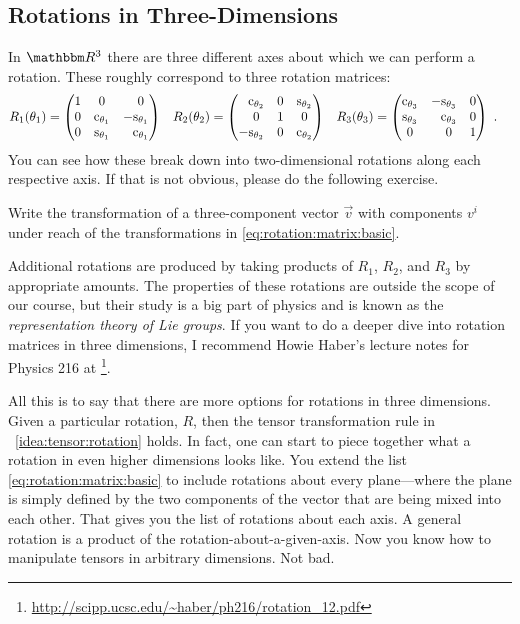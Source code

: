 \documentclass[12pt]{article}
\begin{document}
\subsection{Rotations in Three-Dimensions}

In $\RR ^3$ there are three different axes about which we can perform a rotation. These roughly correspond to three rotation matrices:
\begin{align}
    R_1(\theta_1)
    &=
    \begin{pmatrix}
        1 & 0 & \pp 0 \\
        0 & \text{c}_{\theta_1} & -\text{s}_{\theta_1} \\
        0 & \text{s}_{\theta_1} & \pp \text{c}_{\theta_1}
    \end{pmatrix}
    &
    R_2(\theta_2)
    &=
    \begin{pmatrix}
        \pp \text{c}_{\theta_2} & 0 & \text{s}_{\theta_2} \\
        \pp 0 & 1 & 0 \\
        -\text{s}_{\theta_2} & 0 & \text{c}_{\theta_2}
    \end{pmatrix}
    &
    R_3(\theta_3)
    &=
    \begin{pmatrix}
        \text{c}_{\theta_3} & -\text{s}_{\theta_3} & 0 \\
        \text{s}_{\theta_3} & \pp\text{c}_{\theta_3} & 0 \\
        0 & \pp 0 & 1
    \end{pmatrix} \ .
    \label{eq:rotation:matrix:basic}
\end{align}
You can see how these break down into two-dimensional rotations along each respective axis. If that is not obvious, please do the following exercise.
\begin{exercise}
Write the transformation of a three-component vector $\vec{v}$ with components $v^i$ under reach of the transformations in \eqref{eq:rotation:matrix:basic}. 
\end{exercise}
Additional rotations are produced by taking products of $R_1$, $R_2$, and $R_3$ by appropriate amounts. The properties of these rotations are outside the scope of our course, but their study is a big part of physics and is known as the \emph{representation theory of Lie groups}. If you want to do a deeper dive into rotation matrices in three dimensions, I recommend Howie Haber's lecture notes for Physics 216 at \footnote{\url{http://scipp.ucsc.edu/~haber/ph216/rotation_12.pdf}}. 


All this is to say that there are more options for rotations in three dimensions. Given a particular rotation, $R$, then the tensor transformation rule in \bigidearef~\ref{idea:tensor:rotation} holds. In fact, one can start to piece together what a rotation in even higher dimensions looks like. You extend the list \eqref{eq:rotation:matrix:basic} to include rotations about every plane---where the plane is simply defined by the two components of the vector that are being mixed into each other. That gives you the list of rotations about each axis. A general rotation is a product of the rotation-about-a-given-axis. Now you know how to manipulate tensors in arbitrary dimensions. Not bad.
\end{document}
